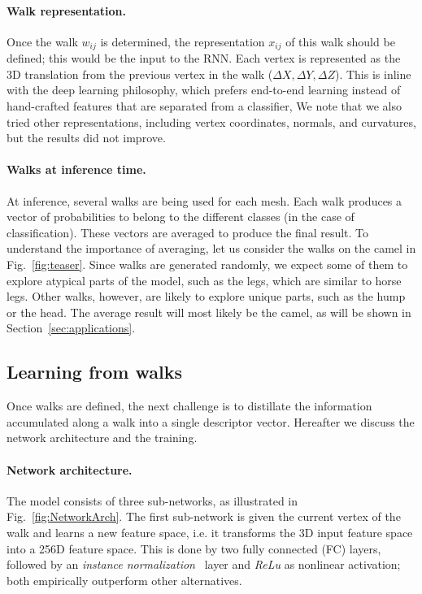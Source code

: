 \documentclass[acmtog]{acmart}
\begin{document}
\paragraph{Walk representation.}
 Once the walk $w_{ij}$ is determined, the representation $x_{ij}$ of this walk should be defined; this would be the input to the RNN. 
Each vertex is represented as the 3D translation from the previous vertex in the walk (${\Delta X, \Delta Y, \Delta Z}$).
This is inline with the deep learning philosophy, which prefers end-to-end learning instead of hand-crafted features that are separated from a classifier, 
We note that we also tried other representations, including vertex coordinates, normals, and curvatures, but the results did not improve.

\paragraph{Walks at inference time.}
At inference, several walks are being used for each mesh.
Each walk produces a vector of probabilities to belong to the different classes (in the case of classification).
These vectors are averaged to produce the final result.
To understand the importance of averaging, let us consider the walks on the camel in Fig.~\ref{fig:teaser}.
Since walks are generated randomly, we expect some of them to explore atypical parts of the model, such as the legs, which are similar to horse legs.
Other walks, however, are likely to explore unique parts, such as the hump or the head.
The average result will most likely be the camel, as will be shown in Section~\ref{sec:applications}.



\subsection{Learning from walks}
\label{subsec:learning}
Once walks are defined, the next challenge is 
to distillate the information accumulated along a walk into a single descriptor vector.
Hereafter we  discuss the network architecture and the training. 

\paragraph{Network architecture.}
The model consists of three sub-networks, as illustrated in  Fig.~\ref{fig:NetworkArch}.
The first sub-network is given the current vertex of the walk and learns a new feature space, i.e.  it transforms the 3D input feature space into a 256D feature space.
This is done by two fully connected (FC) layers, followed by an {\em instance normalization}~\cite{ulyanov2016instance} layer and  {\em ReLu} as nonlinear activation;
both empirically outperform other alternatives.
\end{document}
